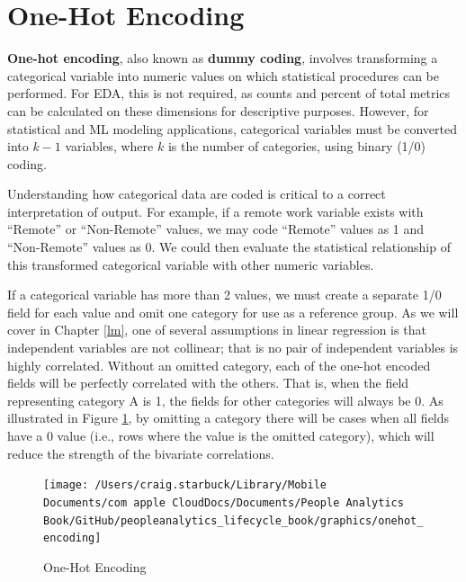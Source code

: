 \documentclass[]{book}
\begin{document}
\hypertarget{one-hot-encoding}{%
\section{One-Hot Encoding}\label{one-hot-encoding}}

\textbf{One-hot encoding}, also known as \textbf{dummy coding}, involves transforming a categorical variable into numeric values on which statistical procedures can be performed. For EDA, this is not required, as counts and percent of total metrics can be calculated on these dimensions for descriptive purposes. However, for statistical and ML modeling applications, categorical variables must be converted into \(k-1\) variables, where \(k\) is the number of categories, using binary (1/0) coding.

Understanding how categorical data are coded is critical to a correct interpretation of output. For example, if a remote work variable exists with ``Remote'' or ``Non-Remote'' values, we may code ``Remote'' values as 1 and ``Non-Remote'' values as 0. We could then evaluate the statistical relationship of this transformed categorical variable with other numeric variables.

If a categorical variable has more than 2 values, we must create a separate 1/0 field for each value and omit one category for use as a reference group. As we will cover in Chapter \ref{lm}, one of several assumptions in linear regression is that independent variables are not collinear; that is no pair of independent variables is highly correlated. Without an omitted category, each of the one-hot encoded fields will be perfectly correlated with the others. That is, when the field representing category A is 1, the fields for other categories will always be 0. As illustrated in Figure \ref{fig:onehot-encoding}, by omitting a category there will be cases when all fields have a 0 value (i.e., rows where the value is the omitted category), which will reduce the strength of the bivariate correlations.

\begin{figure}

{\centering \texttt{[image: /Users/craig.starbuck/Library/Mobile Documents/com~apple~CloudDocs/Documents/People Analytics Book/GitHub/peopleanalytics\_lifecycle\_book/graphics/onehot\_encoding]} 

}

\caption{One-Hot Encoding}\label{fig:onehot-encoding}
\end{figure}
\end{document}

